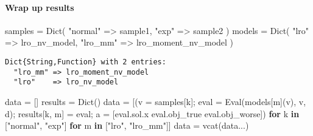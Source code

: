 \documentclass[
  10pt,
  a4paper,
,tablecaptionabove
]{scrartcl}
\newenvironment{Shaded}{}{}
\newcommand{\DataTypeTok}[1]{\textcolor[rgb]{0.56,0.13,0.00}{#1}}
\newcommand{\KeywordTok}[1]{\textcolor[rgb]{0.00,0.44,0.13}{\textbf{#1}}}
\newcommand{\NormalTok}[1]{#1}
\newcommand{\OperatorTok}[1]{\textcolor[rgb]{0.40,0.40,0.40}{#1}}
\newcommand{\StringTok}[1]{\textcolor[rgb]{0.25,0.44,0.63}{#1}}
\begin{document}
\hypertarget{wrap-up-results}{%
\paragraph{Wrap up results}\label{wrap-up-results}}

\begin{Shaded}
\begin{Highlighting}[]
\NormalTok{samples }\OperatorTok{=} \DataTypeTok{Dict}\NormalTok{(}
    \StringTok{"normal"} \OperatorTok{=\textgreater{}}\NormalTok{ sample1}\OperatorTok{,} 
    \StringTok{"exp"} \OperatorTok{=\textgreater{}}\NormalTok{ sample2}
\NormalTok{)}
\NormalTok{models }\OperatorTok{=} \DataTypeTok{Dict}\NormalTok{(}
    \StringTok{"lro"} \OperatorTok{=\textgreater{}}\NormalTok{ lro\_nv\_model}\OperatorTok{,}
    \StringTok{"lro\_mm"} \OperatorTok{=\textgreater{}}\NormalTok{ lro\_moment\_nv\_model}
\NormalTok{)}
\end{Highlighting}
\end{Shaded}

\begin{verbatim}
Dict{String,Function} with 2 entries:
  "lro_mm" => lro_moment_nv_model
  "lro"    => lro_nv_model
\end{verbatim}

\begin{Shaded}
\begin{Highlighting}[]
\NormalTok{data }\OperatorTok{=}\NormalTok{ []}
\NormalTok{results }\OperatorTok{=} \DataTypeTok{Dict}\NormalTok{()}
\NormalTok{data }\OperatorTok{=}\NormalTok{ [(v }\OperatorTok{=}\NormalTok{ samples[k]}\OperatorTok{;} 
\NormalTok{        eval }\OperatorTok{=}\NormalTok{ Eval(models[m](v)}\OperatorTok{,}\NormalTok{ v}\OperatorTok{,}\NormalTok{ d)}\OperatorTok{;} 
\NormalTok{        results[k}\OperatorTok{,}\NormalTok{ m] }\OperatorTok{=}\NormalTok{ eval}\OperatorTok{;}
\NormalTok{        a }\OperatorTok{=}\NormalTok{ [eval.sol.x eval.obj\_true eval.obj\_worse]) }
    \KeywordTok{for}\NormalTok{ k }\KeywordTok{in}\NormalTok{ [}\StringTok{"normal"}\OperatorTok{,} \StringTok{"exp"}\NormalTok{] }\KeywordTok{for}\NormalTok{ m }\KeywordTok{in}\NormalTok{ [}\StringTok{"lro"}\OperatorTok{,} \StringTok{"lro\_mm"}\NormalTok{]]}
\NormalTok{data }\OperatorTok{=}\NormalTok{ vcat(data}\OperatorTok{...}\NormalTok{)}
\end{Highlighting}
\end{Shaded}
\end{document}
